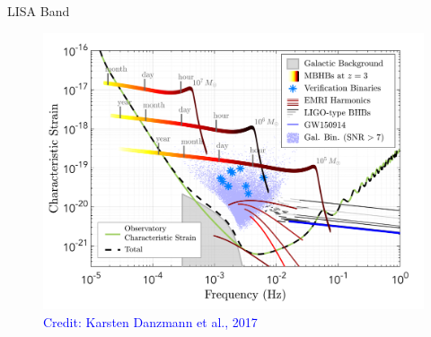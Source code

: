 \documentclass[pdf]{beamer}
\newcommand{\credit}[1]{\tiny{\textcolor{blue}{Credit: #1}}}
\begin{document}
\begin{frame}{LISA Band}
\begin{figure}
\includegraphics[scale=.2]{fig/observedLISA.png}
\caption*{\credit{Karsten Danzmann et al., 2017}}
\end{figure}
\end{frame}
\end{document}
